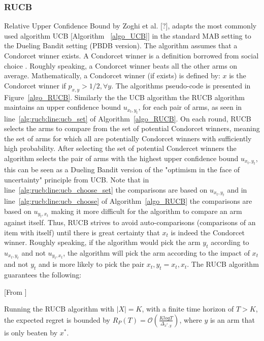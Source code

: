 \documentclass{llncs}
\begin{document}
	\subsubsection{RUCB} Relative Upper Confidence Bound by Zoghi et al. [?], adapts the most commonly used algorithm UCB [Algorithm~ \ref{algo_UCB}] in the standard MAB setting to the Dueling Bandit setting (PBDB version).
	The algorithm assumes that a Condorcet winner exists.
	A Condorcet winner is a definition borrowed from social choice \cite{work by condorcet}.  Roughly speaking, a Condorcet winner beats all the other arms on average. Mathematically, a Condorcet winner (if exists) is defined by: $x$ is the Condorcet winner if $ p_{x,y} > 1/2, \forall y $.
	The algorithms pseudo-code is presented in Figure~\ref{algo_RUCB}.
	Similarly the the UCB algorithm the RUCB algorithm maintains an upper confidence bound $u_{x_t,y_t}$, for each pair of arms, as seen in line~\ref{alg:rucb:line:ucb_set} of Algorithm~\ref{algo_RUCB}.
	On each round, RUCB selects the arms to compare from the set of potential Condorcet winners, meaning the set of arms for which all are potentially Condorcet winners with sufficiently high probability. 
	After selecting the set of potential Condercet winners the algorithm selects the pair of arms with the highest upper confidence bound $u_{x_t,y_t}$, this can be seen as a Dueling Bandit version of the "optimism in the face of uncertainty" principle from UCB.
	Note that in line~\ref{alg:rucb:line:ucb_choose_set} the comparisons are based on $u_{x_t,y_t}$ and in line~\ref{alg:rucb:line:ucb_choose} of Algorithm~\ref{algo_RUCB} the comparisons are based on $u_{y_t,x_t}$ making it more difficult for the algorithm to compare an arm against itself.
	Thus, RUCB strives to avoid auto-comparisons (comparisons of an item with itself) until there is great certainty that $x_t$ is indeed the Condorcet winner.
	Roughly speaking, if the algorithm would pick the arm $y_t$ according to $u_{x_t,y_t}$ and not $u_{y_t,x_t}$, the algorithm will pick the arm according to the impact of $x_t$ and not $y_t$ and is more likely to pick the pair $x_t,y_t = x_t,x_t$. 
	The RUCB algorithm guarantees the following:
	\begin{theorem}\label{thm:BTM}[From \cite{...}]

		Running the RUCB algorithm with $|X|=K$, with a finite time horizon of $T>K$, the expected regret is bounded by $R_P(T) = \mathcal{O} \left( \frac{K log T}{\Delta_{x^*,y}} \right)$, where $y$ is an arm that is only beaten by $x^*$.

	\end{theorem}
	
\end{document}
